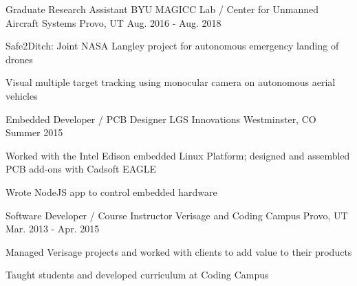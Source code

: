 

\begin{cventries}

  \cventry
    {Graduate Research Assistant} %
    {BYU MAGICC Lab / Center for Unmanned Aircraft Systems} %
    {Provo, UT} %
    {Aug. 2016 - Aug. 2018} %
    {
      \begin{cvitems} %
        \item Safe2Ditch: Joint NASA Langley project for autonomous emergency landing of drones
        \item Visual multiple target tracking using monocular camera on autonomous aerial vehicles
      \end{cvitems}
    }
    
\cventry
	{Embedded Developer / PCB Designer} %
	{LGS Innovations} %
	{Westminster, CO} %
	{Summer 2015} %
	{
		\begin{cvitems} %
			\item Worked with the Intel Edison embedded Linux Platform; designed and assembled PCB add-ons with Cadsoft EAGLE
			\item Wrote NodeJS app to control embedded hardware
		\end{cvitems}
	}
	
\cventry
	{Software Developer / Course Instructor} %
	{Verisage and Coding Campus} %
	{Provo, UT} %
	{Mar. 2013 - Apr. 2015} %
	{
		\begin{cvitems} %
			\item Managed Verisage projects and worked with clients to add value to their products
			\item Taught students and developed curriculum at Coding Campus
		\end{cvitems}
	}
\end{cventries}
